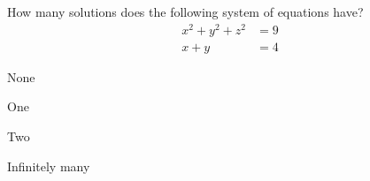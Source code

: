 \documentclass[nooutcomes,noauthor]{ximera}
\begin{document}
\begin{exercise}
  How many solutions does the following system of equations have?
  \begin{align*}
    x^2 + y^2 + z^2 &= 9\\
    x+y &=4
  \end{align*}
   \begin{enumerate}
\begin{multicols}{2}
 \item None
 \item One
 \item Two
 \item Infinitely many
\end{multicols}
\end{enumerate}
\end{exercise}



\end{document}
